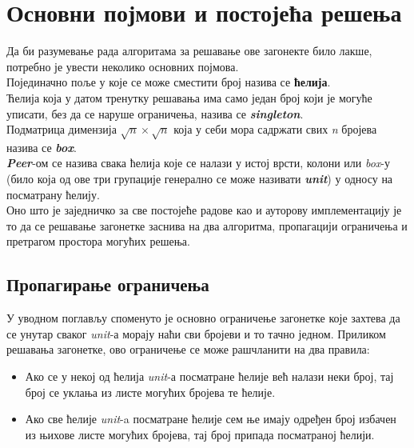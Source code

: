 \section{Основни појмови и постојећа решења}

Да би разумевање рада алгоритама за решавање ове загонекте било лакше, потребно је увести неколико основних појмова.\\

Појединачно поље у које се може сместити број назива се \textbf{ћелија}.\\

Ћелија која у датом тренутку решавања има само један број који је могуће уписати, без да се наруше ограничења, назива се \textbf{\textit{singleton}}.\\

Подматрица димензија \(\sqrt{n} \times \sqrt{n}\) која у себи мора садржати свих \textit{n} бројева назива се \textbf{\textit{box}}.\\

\textbf{\textit{Peer}}-ом се назива свака ћелија које се налази у истој врсти, колони или \textit{box}-у (било која од ове три групације генерално се може називати \textbf{\textit{unit}}) у односу на посматрану ћелију.\\

Оно што је заједничко за све постојеће радове \cite{sudokuMulti,sudokuReport,sudokuMPI} као и ауторову имплементацију је то да се решавање загонетке заснива на два алгоритма, пропагацији ограничења и претрагом простора могућих решења.

\subsection{Пропагирање ограничења}
У уводном поглављу споменуто је основно ограничење загонетке које захтева да се унутар сваког \textit{unit}-а морају наћи сви бројеви и то тачно једном. Приликом решавања загонетке, ово ограничење се може рашчланити на два правила:
\begin{itemize}\label{rules}
    \item Ако се у некој од ћелија \textit{unit}-а посматране ћелије већ налази неки број, тај број се уклања из листе могућих бројева те ћелије.
    \item Ако све ћелије \textit{unit}-a посматране ћелије сем ње имају одређен број избачен из њихове листе могућих бројева, тај број припада посматраној ћелији.
\end{itemize}

